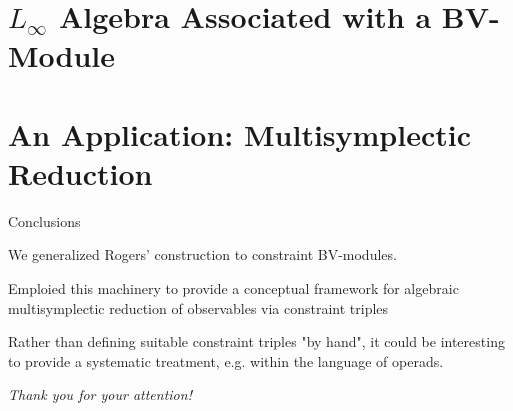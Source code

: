 \documentclass[handout,10pt]{beamer}
\begin{document}
\section{$L_\infty$ Algebra Associated with a BV-Module}
	

\section{An Application: Multisymplectic Reduction}
	



	\addtocounter{framenumber}{-1}
		\begin{frame}{Conclusions}
			\begin{upshotblocktitle}
				We generalized Rogers' construction to constraint BV-modules.
			\end{upshotblocktitle}
			\vfill\pause

			\begin{claimblocktitle}
				 Emploied this machinery to provide a conceptual framework for algebraic multisymplectic reduction of observables via constraint triples 
				 \smallskip

				 \nocite{Blacker-M-Ryvkin-2024}
			\end{claimblocktitle}
			\vfill\pause

			\begin{outlookblock}
				Rather than defining suitable constraint triples "by hand", it could be interesting to provide a systematic treatment, e.g. within the language of operads.
			\end{outlookblock}
			\vfill\pause

		  	\centering 
		  	{\Huge\color{red} 
		  	\emph{Thank you for your attention!}\normalsize \color{black}}
			\vfill
 
		\end{frame}
\end{document}
